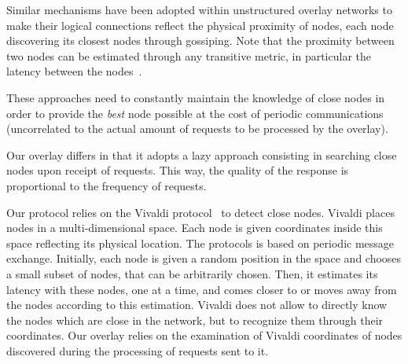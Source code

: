 
Similar mechanisms have been adopted within unstructured overlay networks to
make their logical connections reflect the physical proximity of nodes, each
node discovering its closest nodes through gossiping. Note that the proximity
between two nodes can be estimated through any transitive metric, in particular
the latency between the nodes~\cite{refquivabienmarindoittrouver}.

These approaches need to constantly maintain the knowledge of close nodes in
order to provide the \emph{best} node possible at the cost of periodic
communications (uncorrelated to the actual amount of requests to be processed by
the overlay).


 Our overlay differs in that it adopts a lazy approach consisting
in searching close nodes upon receipt of requests. This way, the quality of the
response is proportional to the frequency of requests. 


Our protocol relies on the Vivaldi protocol~\cite{dabek:2001:sigcomm04} to
detect close nodes. Vivaldi places nodes in a multi-dimensional space. Each node
is given coordinates inside this space reflecting its physical location. The
protocols is based on periodic message exchange. Initially, each node is given a
random position in the space and chooses a small subset of nodes, that can be
arbitrarily chosen. Then, it estimates its latency with these nodes, one at a
time, and comes closer to or moves away from the nodes according to this
estimation. Vivaldi does not allow to directly know the nodes which are close in
the network, but to recognize them through their coordinates. Our overlay relies
on the examination of Vivaldi coordinates of nodes discovered during the
processing of requests sent to it.






